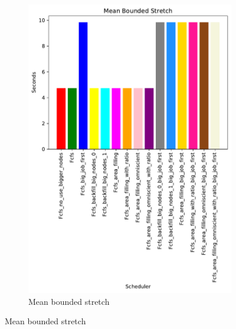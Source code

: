 \documentclass[a4paper]{article}
\begin{document}
\begin{figure}[H]
\begin{subfigure}[b]{0.4\linewidth}\centering\includegraphics[width=1\linewidth]{MBSS/plot/Size_Constraint_2022-01-24->2022-01-24_Mean_Stretch_With_a_Minimum_450_128_32_256_4_1024.pdf}\caption{Mean bounded stretch}\label{7}\end{subfigure}

\end{figure}
\end{document}
